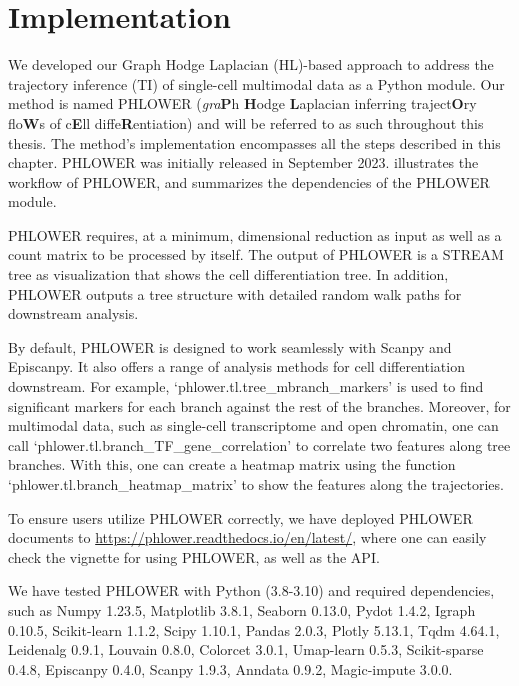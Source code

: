 \section{Implementation}
\label{TI_methods:implementation}
We developed our Graph Hodge Laplacian (HL)-based approach to address the trajectory inference (TI) of single-cell multimodal data as a Python module. Our method is named PHLOWER (\textit{gra}\textbf{P}h \textbf{H}odge \textbf{L}aplacian inferring traject\textbf{O}ry flo\textbf{W}s of c\textbf{E}ll diffe\textbf{R}entiation) and will be referred to as such throughout this thesis. The method's implementation encompasses all the steps described in this chapter. PHLOWER was initially released in September 2023.  illustrates the workflow of PHLOWER, and  summarizes the dependencies of the PHLOWER module.

PHLOWER requires, at a minimum, dimensional reduction as input as well as a count matrix to be processed by itself. The output of PHLOWER is a STREAM tree as visualization that shows the cell differentiation tree. In addition, PHLOWER outputs a tree structure with detailed random walk paths for downstream analysis.

By default, PHLOWER is designed to work seamlessly with Scanpy and Episcanpy. It also offers a range of analysis methods for cell differentiation downstream. For example, `phlower.tl.tree\_mbranch\_markers' is used to find significant markers for each branch against the rest of the branches. Moreover, for multimodal data, such as single-cell transcriptome and open chromatin, one can call `phlower.tl.branch\_TF\_gene\_correlation' to correlate two features along tree branches. With this, one can create a heatmap matrix using the function `phlower.tl.branch\_heatmap\_matrix' to show the features along the trajectories.

To ensure users utilize PHLOWER correctly, we have deployed PHLOWER documents to \url{https://phlower.readthedocs.io/en/latest/}, where one can easily check the vignette for using PHLOWER, as well as the API.

We have tested PHLOWER with Python (3.8-3.10) and required dependencies, such as Numpy 1.23.5, Matplotlib 3.8.1, Seaborn 0.13.0, Pydot 1.4.2, Igraph 0.10.5, Scikit-learn 1.1.2, Scipy 1.10.1, Pandas 2.0.3, Plotly 5.13.1, Tqdm 4.64.1, Leidenalg 0.9.1, Louvain 0.8.0, Colorcet 3.0.1, Umap-learn 0.5.3, Scikit-sparse 0.4.8, Episcanpy 0.4.0, Scanpy 1.9.3, Anndata 0.9.2, Magic-impute 3.0.0.

